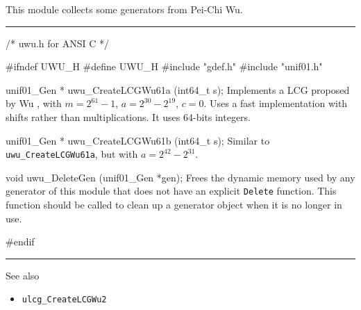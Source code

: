 
This module collects some generators from Pei-Chi Wu.


\bigskip
\hrule
\code\hide
/* uwu.h for ANSI C */

#ifndef UWU_H
#define UWU_H
\endhide
#include "gdef.h"
#include "unif01.h"


unif01_Gen * uwu_CreateLCGWu61a (int64_t s);
\endcode
  \tab  Implements a LCG proposed by Wu \cite{rWU97a},
  with $m= 2^{61}-1$, $a = 2^{30} - 2^{19}$, $c=0$.
  Uses a fast implementation with shifts rather than
  multiplications.
  It uses 64-bits integers. %
 \endtab
\code


unif01_Gen * uwu_CreateLCGWu61b (int64_t s);
\endcode
  \tab   Similar to {\tt uwu\_CreateLCGWu61a},
   but with  $a = 2^{42} - 2^{31}$.
 \endtab
\code
\endcode




\code


void uwu_DeleteGen (unif01_Gen *gen);
\endcode
 \tab Frees the dynamic memory used by any generator of this module
  that does not have an explicit {\tt Delete} function.
  This function should be called to clean up a generator object
  when it is no longer in use.
 \endtab
\code

\hide
#endif
\endhide
\endcode


\bigskip
\hrule
\bigskip

{
See also
\bigskip

\setlength{\partopsep}{0pt}
\setlength{\parskip}{0pt}
\setlength{\topsep}{0pt}
\setlength{\itemsep}{0pt}

\begin{itemize}
\item {\tt ulcg\_CreateLCGWu2}
\end{itemize}
}
